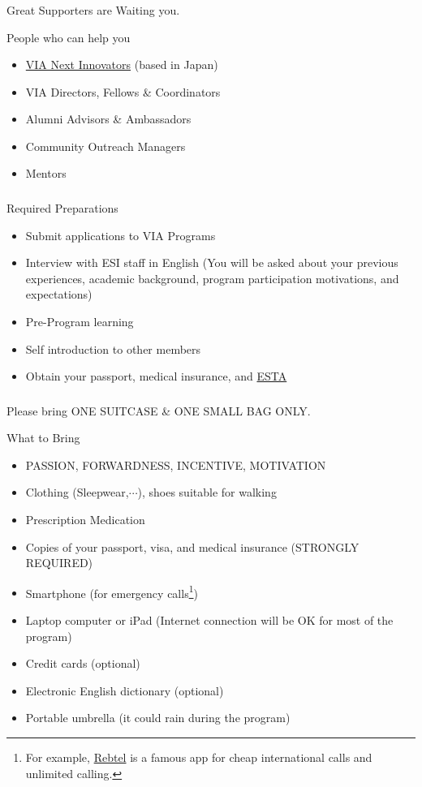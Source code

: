 \documentclass[dvipdfmx,10pt]{beamer}
\newcommand{\ft}{\frametitle}
\begin{document}
\begin{frame}\ft{\insertsection}
Great Supporters are Waiting you.
\begin{exampleblock}{People who can help you}
\begin{itemize}
    \item \href{https://sites.google.com/a/viaprograms.org/via-next-innovators-homepage/english-version}{VIA Next Innovators} (based in Japan)
    \item VIA Directors, Fellows \& Coordinators
    \item Alumni Advisors \& Ambassadors
    \item Community Outreach Managers
    \item Mentors
\end{itemize}
\end{exampleblock}
\end{frame}
\begin{frame}\ft{\insertsection}
\begin{alertblock}{Required Preparations}
\begin{itemize}
\item Submit applications to VIA Programs
\item Interview with ESI staff in English (You will be asked about your previous experiences, academic background, program participation motivations, and expectations)
\item Pre-Program learning
\item Self introduction to other members
\item Obtain your passport, medical insurance, and \href{https://esta.cbp.dhs.gov/}{ESTA}
\end{itemize}
\end{alertblock}
\end{frame}
\begin{frame}\ft{\insertsection}
Please bring ONE SUITCASE \& ONE SMALL BAG ONLY.
\begin{alertblock}{What to Bring}
\begin{itemize}
\item PASSION, FORWARDNESS, INCENTIVE, MOTIVATION
\item Clothing (Sleepwear,$\cdots$), shoes suitable for walking
\item Prescription Medication
\item Copies of your passport, visa, and medical insurance (STRONGLY REQUIRED)
\item Smartphone (for emergency calls\footnote{For example, \href{https://www.rebtel.com/en/}{Rebtel} is a famous app for cheap international calls and unlimited calling.})
\item Laptop computer or iPad (Internet connection will be OK for most of the program)
\item Credit cards (optional)
\item Electronic English dictionary (optional)
\item Portable umbrella (it could rain during the program)
\end{itemize}
\end{alertblock}
\end{frame}
\end{document}
